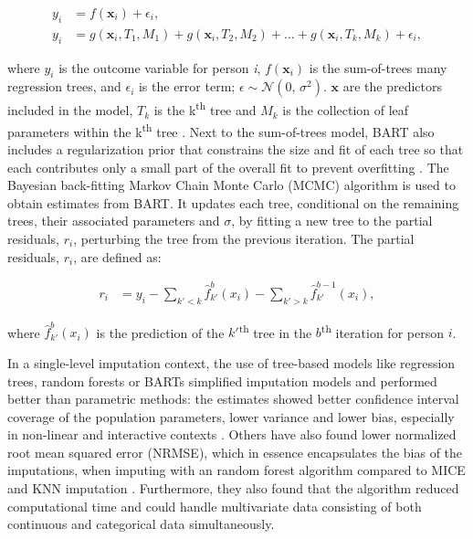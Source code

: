 \documentclass[10pt, a4paper, titlepage]{article}
\begin{document}
\begin{subequations}
\label{eq:BART}
\begin{align}
y_i &= f(\textbf{x}_i) + \epsilon_i, \tag{1.1} \\
y_i &= g(\textbf{x}_{i}, T_{1}, M_{1})+ g(\textbf{x}_{i}, T_{2}, M_{2}) + \dots + g(\textbf{x}_{i}, T_{k}, M_{k}) + \epsilon_i, \tag{1.2}
\end{align}
\end{subequations}

where $y_i$ is the outcome variable for person \textit{i}, $f(\textbf{x}_i)$ is the sum-of-trees many regression trees, and $\epsilon_i$ is the error term; $\epsilon \sim \mathcal{N}(0,\,\sigma^{2})$. $\textbf{x}$ are the predictors included in the model, $T_{k}$ is the k\textsuperscript{th} tree and $M_{k}$ is the collection of leaf parameters within the k\textsuperscript{th} tree \citep{chipman2010, hill2020, james2021}. Next to the sum-of-trees model, BART also includes a regularization prior that constrains the size and fit of each tree so that each contributes only a small part of the overall fit to prevent overfitting \citep{chipman2010, hill2020, james2021}. The Bayesian back-fitting Markov Chain Monte Carlo (MCMC) algorithm is used to obtain estimates from BART. It updates each tree, conditional on the remaining trees, their associated parameters and $\sigma$, by fitting a new tree to the partial residuals, $r_{i}$, perturbing the tree from the previous iteration. The partial residuals, $r_{i}$, are defined as:

\begin{subequations}
\label{eq:partialresiduals}
\begin{align}
r_i &= y_i - \sum_{k' < k} \hat{f}^{b}_{k'}(x_{i}) - \sum_{k' > k} \hat{f}^{b-1}_{k'}(x_{i}), \tag{2}
\end{align}
\end{subequations}

where $\hat{f}^{b}_{k'}(x_{i})$ is the prediction of the $k'$\textsuperscript{th} tree in the $b$\textsuperscript{th} iteration for person $i$.

In a single-level imputation context, the use of tree-based models like regression trees, random forests or BARTs simplified imputation models and performed better than parametric methods: the estimates showed better confidence interval coverage of the population parameters, lower variance and lower bias, especially in non-linear and interactive contexts \citep{burgette2010, xu2016, silva2022}. Others have also found lower normalized root mean squared error (NRMSE), which in essence encapsulates the bias of the imputations, when imputing with an random forest algorithm compared to MICE and KNN imputation \citep{stekhoven2012, waljee2013}. Furthermore, they also found that the algorithm reduced computational time and could handle multivariate data consisting of both continuous and categorical data simultaneously.
\end{document}
